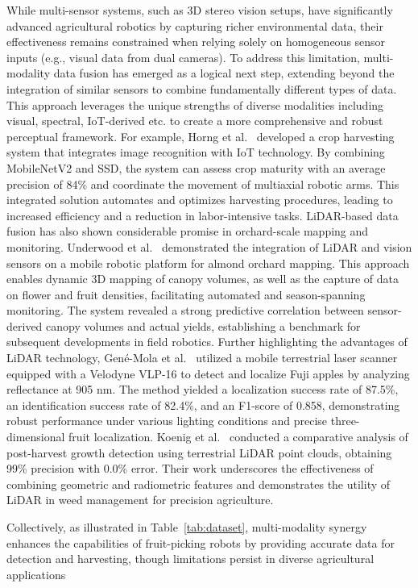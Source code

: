 \documentclass[a4paper,fleqn]{cas-dc}
\begin{document}
While multi-sensor systems, such as 3D stereo vision setups, have significantly advanced agricultural robotics by capturing richer environmental data, their effectiveness remains constrained when relying solely on homogeneous sensor inputs (e.g., visual data from dual cameras). To address this limitation, multi-modality data fusion has emerged as a logical next step, extending beyond the integration of similar sensors to combine fundamentally different types of data. This approach leverages the unique strengths of diverse modalities including visual, spectral, IoT-derived etc. to create a more comprehensive and robust perceptual framework.
For example, Horng et al.~\cite{horng2019smart} developed a crop harvesting system that integrates image recognition with IoT technology. By combining MobileNetV2 and SSD, the system can assess crop maturity with an average precision of 84\% and coordinate the movement of multiaxial robotic arms. This integrated solution automates and optimizes harvesting procedures, leading to increased efficiency and a reduction in labor-intensive tasks.
LiDAR-based data fusion has also shown considerable promise in orchard-scale mapping and monitoring. Underwood et al.~\cite{underwood2016mapping} demonstrated the integration of LiDAR and vision sensors on a mobile robotic platform for almond orchard mapping. This approach enables dynamic 3D mapping of canopy volumes, as well as the capture of data on flower and fruit densities, facilitating automated and season-spanning monitoring. The system revealed a strong predictive correlation between sensor-derived canopy volumes and actual yields, establishing a benchmark for subsequent developments in field robotics.
Further highlighting the advantages of LiDAR technology, Gené-Mola et al.~\cite{gene2019fruit} utilized a mobile terrestrial laser scanner equipped with a Velodyne VLP-16 to detect and localize Fuji apples by analyzing reflectance at 905 nm. The method yielded a localization success rate of 87.5\%, an identification success rate of 82.4\%, and an F1-score of 0.858, demonstrating robust performance under various lighting conditions and precise three-dimensional fruit localization. Koenig et al.~\cite{koenig2015comparative} conducted a comparative analysis of post-harvest growth detection using terrestrial LiDAR point clouds, obtaining 99\% precision with 0.0\% error. Their work underscores the effectiveness of combining geometric and radiometric features and demonstrates the utility of LiDAR in weed management for precision agriculture.

Collectively, as illustrated in Table~\ref{tab:dataset}, multi-modality synergy enhances the capabilities of fruit-picking robots by providing accurate data for detection and harvesting, though limitations persist in diverse agricultural applications
\end{document}
